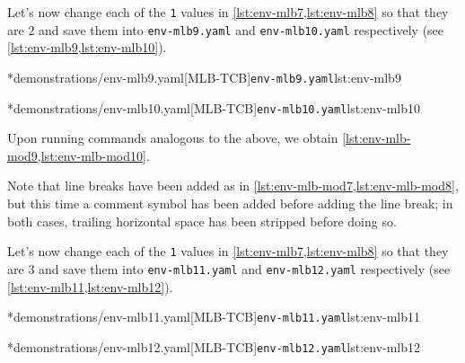	Let's now change each of the \texttt{1} values in
	\cref{lst:env-mlb7,lst:env-mlb8} so that they are $2$ and save them
	into \texttt{env-mlb9.yaml} and \texttt{env-mlb10.yaml} respectively (see
	\cref{lst:env-mlb9,lst:env-mlb10}).

	\begin{minipage}{.49\textwidth}
		\cmhlistingsfromfile[style=yaml-LST]*{demonstrations/env-mlb9.yaml}[MLB-TCB]{\texttt{env-mlb9.yaml}}{lst:env-mlb9}
	\end{minipage}
	\hfill
	\begin{minipage}{.49\textwidth}
		\cmhlistingsfromfile[style=yaml-LST]*{demonstrations/env-mlb10.yaml}[MLB-TCB]{\texttt{env-mlb10.yaml}}{lst:env-mlb10}
	\end{minipage}

	Upon running commands analogous to the above, we obtain \cref{lst:env-mlb-mod9,lst:env-mlb-mod10}.

	\begin{widepage}
		\begin{minipage}{.43\linewidth}
		\end{minipage}
		\hfill
		\begin{minipage}{.56\linewidth}
		\end{minipage}
	\end{widepage}

	Note that line breaks have been added as in \cref{lst:env-mlb-mod7,lst:env-mlb-mod8}, but this time a
	comment symbol has been added before adding the line break; in both cases, trailing
	horizontal space has been stripped before doing so.

	Let's%
	 now change each
	of the \texttt{1} values in \cref{lst:env-mlb7,lst:env-mlb8} so that they
	are $3$ and save them into \texttt{env-mlb11.yaml} and
	\texttt{env-mlb12.yaml} respectively (see \cref{lst:env-mlb11,lst:env-mlb12}).

	\begin{minipage}{.49\textwidth}
		\cmhlistingsfromfile[style=yaml-LST]*{demonstrations/env-mlb11.yaml}[MLB-TCB]{\texttt{env-mlb11.yaml}}{lst:env-mlb11}
	\end{minipage}
	\hfill
	\begin{minipage}{.49\textwidth}
		\cmhlistingsfromfile[style=yaml-LST]*{demonstrations/env-mlb12.yaml}[MLB-TCB]{\texttt{env-mlb12.yaml}}{lst:env-mlb12}
	\end{minipage}

